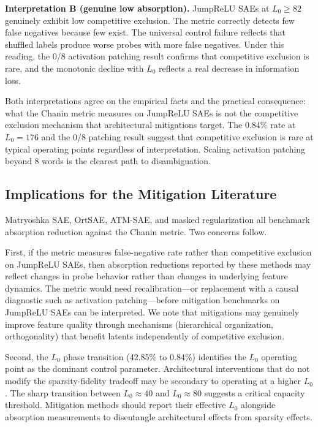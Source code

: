 \documentclass{article}
\begin{document}
\textbf{Interpretation B (genuine low absorption).} JumpReLU SAEs at $L_0 \geq 82$ genuinely exhibit low competitive exclusion. The metric correctly detects few false negatives because few exist. The universal control failure reflects that shuffled labels produce worse probes with more false negatives. Under this reading, the 0/8 activation patching result confirms that competitive exclusion is rare, and the monotonic decline with $L_0$ reflects a real decrease in information loss.

Both interpretations agree on the empirical facts and the practical consequence: what the Chanin metric measures on JumpReLU SAEs is not the competitive exclusion mechanism that architectural mitigations target. The 0.84\% rate at $L_0 = 176$ and the 0/8 patching result suggest that competitive exclusion is rare at typical operating points regardless of interpretation. Scaling activation patching beyond 8 words is the clearest path to disambiguation.

\subsection{Implications for the Mitigation Literature}

Matryoshka SAE, OrtSAE, ATM-SAE, and masked regularization all benchmark absorption reduction against the Chanin metric. Two concerns follow.

First, if the metric measures false-negative rate rather than competitive exclusion on JumpReLU SAEs, then absorption reductions reported by these methods may reflect changes in probe behavior rather than changes in underlying feature dynamics. The metric would need recalibration---or replacement with a causal diagnostic such as activation patching---before mitigation benchmarks on JumpReLU SAEs can be interpreted. We note that mitigations may genuinely improve feature quality through mechanisms (hierarchical organization, orthogonality) that benefit latents independently of competitive exclusion.

Second, the $L_0$ phase transition (42.85\% to 0.84\%) identifies the $L_0$ operating point as the dominant control parameter. Architectural interventions that do not modify the sparsity-fidelity tradeoff may be secondary to operating at a higher $L_0$. The sharp transition between $L_0 \approx 40$ and $L_0 \approx 80$ suggests a critical capacity threshold. Mitigation methods should report their effective $L_0$ alongside absorption measurements to disentangle architectural effects from sparsity effects.
\end{document}
